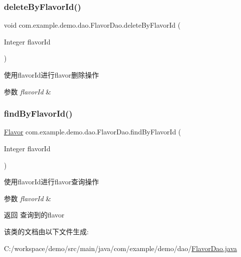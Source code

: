 \subsubsection{\texorpdfstring{delete\+By\+Flavor\+Id()}{deleteByFlavorId()}}
{\footnotesize\ttfamily void com.\+example.\+demo.\+dao.\+Flavor\+Dao.\+delete\+By\+Flavor\+Id (\begin{DoxyParamCaption}\item[{Integer}]{flavor\+Id }\end{DoxyParamCaption})}

使用flavor\+Id进行flavor删除操作 
\begin{DoxyParams}{参数}
{\em flavor\+Id} & \\
\hline
\end{DoxyParams}
\mbox{\label{interfacecom_1_1example_1_1demo_1_1dao_1_1_flavor_dao_a8ddd9bd8d2d11277f36fa785c240869d}} 
\subsubsection{\texorpdfstring{find\+By\+Flavor\+Id()}{findByFlavorId()}}
{\footnotesize\ttfamily \mbox{\hyperlink{classcom_1_1example_1_1demo_1_1modular_1_1_flavor}{Flavor}} com.\+example.\+demo.\+dao.\+Flavor\+Dao.\+find\+By\+Flavor\+Id (\begin{DoxyParamCaption}\item[{Integer}]{flavor\+Id }\end{DoxyParamCaption})}

使用flavor\+Id进行flavor查询操作 
\begin{DoxyParams}{参数}
{\em flavor\+Id} & \\
\hline
\end{DoxyParams}
\begin{DoxyReturn}{返回}
查询到的flavor 
\end{DoxyReturn}


该类的文档由以下文件生成\+:\begin{DoxyCompactItemize}
\item 
C\+:/workspace/demo/src/main/java/com/example/demo/dao/\mbox{\hyperlink{_flavor_dao_8java}{Flavor\+Dao.\+java}}\end{DoxyCompactItemize}
